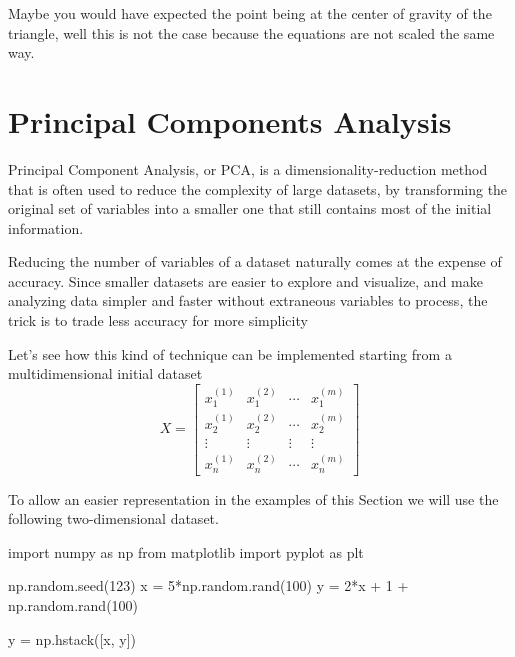 Maybe you would have expected the point being at the center of gravity of the triangle, well this is not the case because the equations are not scaled the same way.



\section{Principal Components Analysis}
\label{sec:pca}

Principal Component Analysis, or PCA, is a dimensionality-reduction method that is often used to reduce the complexity of large datasets, by transforming the original set of variables into a smaller one that still contains most of the initial information.

Reducing the number of variables of a dataset naturally comes at the expense of accuracy. Since smaller datasets are easier to explore and visualize, and make analyzing data simpler and faster without extraneous variables to process, the trick is to trade less accuracy for more simplicity

Let's see how this kind of technique can be implemented starting from 
a multidimensional initial dataset 
\begin{equation}
X=\begin{bmatrix}
x^{(1)}_1 &x^{(2)}_1&\cdots &x^{(m)}_1 \\
x^{(1)}_2 &x^{(2)}_2&\cdots &x^{(m)}_2 \\
\vdots &\vdots &\vdots &\vdots \\
x^{(1)}_n &x^{(2)}_n&\cdots &x^{(m)}_n 
\end{bmatrix}
\end{equation}

To allow an easier representation in the examples of this Section we will use the following two-dimensional dataset.

\begin{ipython}
import numpy as np
from matplotlib import pyplot as plt
	
np.random.seed(123)
x = 5*np.random.rand(100)
y = 2*x + 1 + np.random.rand(100)

y = np.hstack([x, y])
\end{ipython}

